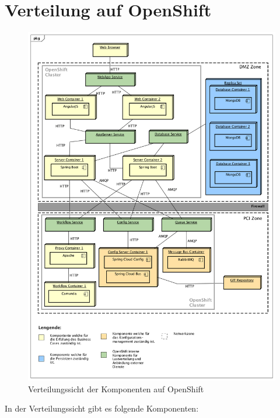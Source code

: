 \section{Verteilung auf OpenShift}
\label{deploy-dia}
\begin{figure}[H]
	\centering
	\includegraphics[scale=0.44]{OpenShiftDeployment.png}
	\caption{Verteilungssicht der Komponenten auf OpenShift}
\end{figure}
\newpage
In der Verteilungssicht gibt es folgende Komponenten:\newline
